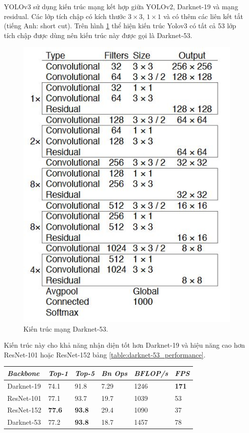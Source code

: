 YOLOv3 sử dụng kiến trúc mạng kết hợp giữa YOLOv2, Darknet-19 và mạng residual. Các lớp tích chập có kích thước $3 \times 3$, $1 \times 1$ và có thêm các liên kết tắt (tiếng Anh: short cut). Trên hình \ref{fig:yolov3_architechture} thể hiện kiến trúc Yolov3 có tất cả 53 lớp tích chập được dùng nên kiến trúc này được gọi là Darknet-53.
\begin{figure}[ht!]
	\centerline{\includegraphics[scale=0.8]{images/yolov3_architecture.jpg}}
  	\caption{Kiến trúc mạng Darknet-53.}
  	\label{fig:yolov3_architechture}
\end{figure}
Kiến trúc này cho khả năng nhận diện tốt hơn Darknet-19 và hiệu năng cao hơn ResNet-101 hoặc ResNet-152 bảng \ref{table:darknet-53_performance}.
\begin{center}

  \begin{tabular} {l l l l l l}
  \toprule
  \it Backbone & \it Top-1 & \it Top-5 & \it Bn Ops & \it BFLOP/s & \it FPS \\
  \midrule

  Darknet-19 & 74.1 & 91.8 & 7.29 & 1246 & \textbf{171} \\
  ResNet-101 & 77.1 & 93.7 & 19.7 & 1039 & 53 \\
  ResNet-152 & \textbf{77.6} & \textbf{93.8} & 29.4 & 1090 & 37 \\
  Darknet-53 & 77.2 & \textbf{93.8} & 18.7 & 1457 & 78 \\
          
  \bottomrule
  \end{tabular}

\end{center}
